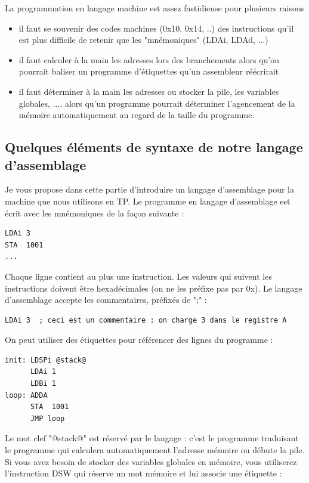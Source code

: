 La programmation en langage machine est assez fastidieuse pour plusieurs raisons 
\begin{itemize}
\item il faut se souvenir des codes machines (0x10, 0x14, ..) des instructions qu'il est plus difficile de retenir que les "mnémoniques" (LDAi, LDAd, ...)
\item il faut calculer à la main les adresses lors des branchements alors qu'on pourrait baliser un programme d'étiquettes qu'un assembleur réécrirait
\item il faut déterminer à la main les adresses ou stocker la pile, les variables globales, .... alors qu'un programme pourrait déterminer l'agencement de la mémoire automatiquement au regard de la taille du programme.
\end{itemize}

\subsection{Quelques éléments de syntaxe de notre langage d'assemblage}

Je vous propose dans cette partie d'introduire un langage d'assemblage pour la machine que nous utilisons en TP. Le programme en langage d'assemblage est écrit avec les mnémoniques de la façon suivante :

\begin{verbatim}
LDAi 3
STA  1001
...
\end{verbatim}

Chaque ligne contient au plus une instruction. Les valeurs qui suivent les instructions doivent être hexadécimales (on ne les préfixe pas par 0x). Le langage d'assemblage accepte les commentaires, préfixés de ";" :

\begin{verbatim}
LDAi 3  ; ceci est un commentaire : on charge 3 dans le registre A
\end{verbatim}

On peut utiliser des étiquettes pour référencer des lignes du programme :

\begin{verbatim}
init: LDSPi @stack@
      LDAi 1
      LDBi 1
loop: ADDA
      STA  1001
      JMP loop
\end{verbatim}

Le mot clef "@stack@" est réservé par le langage : c'est le programme traduisant le programme qui calculera automatiquement l'adresse mémoire ou débute la pile. Si vous avez besoin de stocker des variables globales en mémoire, vous utiliserez l'instruction DSW qui réserve un mot mémoire et lui associe une étiquette :

